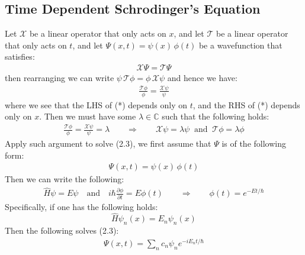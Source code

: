 \documentclass[11pt]{book}
\theoremstyle{break}
\theoremstyle{break}
\newcommand{\C}{\mathbb{C}}
\newcommand{\pd}{\partial}
\begin{document}
\subsection{Time Dependent Schrodinger's Equation}
Let $\mathcal{X}$ be a linear operator that only acts on $x$, and let $\mathcal{T}$ be a linear operator that only acts on $t$, and let $\Psi(x,t) = \psi(x)\, \phi(t)$ be a wavefunction that satisfies:
\begin{align*}
\mathcal{X}\Psi = \mathcal{T} \Psi
\end{align*}
then rearranging we can write $
\psi\, \mathcal{T}\phi = \phi\, \mathcal{X}\psi
$ and hence we have:
\begin{align*}
 \frac{\mathcal{T}\phi}{\phi} = \frac{\mathcal{X}\psi}{\psi} \tag{*}
\end{align*}
where we see that the LHS of (*) depends only on $t$, and the RHS of (*) depends only on $x$. Then we must have some $\lambda \in \C$ such that the following holds:
\begin{align*}
 \frac{\mathcal{T}\phi}{\phi} = \frac{\mathcal{X}\psi}{\psi} = \lambda \qquad\Rightarrow \qquad \mathcal{X}\psi = \lambda \psi \ \text{ and }\ \mathcal{T}\phi = \lambda \phi
\end{align*}
Apply such argument to solve (2.3), we first assume that $\Psi$ is of the following form:
\begin{align*}
\Psi(x,t) = \psi(x)\, \phi(t)
\end{align*}
Then we can write the following:
\begin{align*}
\hat{H}\psi = E\psi \quad \text{and}\quad i\hbar \frac{\pd \phi}{\pd t} = E\phi(t) \qquad \Rightarrow \qquad \phi(t) = e^{-Et/\hbar}
\end{align*}
Specifically, if one has the following holds:
$$\hat{H}\psi_n(x) = E_n \psi_n(x)$$
Then the following solves (2.3):
\begin{align*}
\Psi(x,t) = \sum_n c_n \psi_n e^{-iE_nt/\hbar}
\end{align*}
\end{document}
